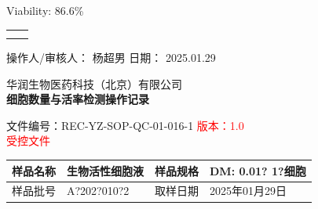 \documentclass[UTF8,10pt,a4paper,fontset=fandol]{ctexart}
\renewcommand{\arraystretch}{1.15}
\newcommand{\fieldvalue}[1]{#1}
\newcommand{\handwritten}[1]{#1}
\begin{document}
\begin{center}
\begin{center}
Viability:
\fieldvalue{86.6\%}

\vspace{1em}

\begin{center}
\begin{tabular}{cc}
\fbox{\rule{0pt}{0.27\textwidth}\rule{0.43\textwidth}{0pt}}
&
\fbox{\rule{0pt}{0.27\textwidth}\rule{0.43\textwidth}{0pt}}
\\[1em]
\fbox{\rule{0pt}{0.27\textwidth}\rule{0.43\textwidth}{0pt}}
&
\fbox{\rule{0pt}{0.27\textwidth}\rule{0.43\textwidth}{0pt}}
\end{tabular}
\end{center}

\vfill

操作人/审核人：
\fieldvalue{\handwritten{杨超男}}
\hfill
日期：
\fieldvalue{\handwritten{2025.01.29}}

\newpage

\begin{center}
\small
华润生物医药科技（北京）有限公司\\
\textbf{细胞数量与活率检测操作记录}\\
\end{center}

\noindent
文件编号：REC-YZ-SOP-QC-01-016-1 \hfill
\textcolor{red}{版本：1.0}\\
\textcolor{red}{受控文件}

\renewcommand{\arraystretch}{1.25}

\noindent
\begin{tabularx}{\textwidth}{|p{2.2cm}|X|p{2.2cm}|X|}
\hline
样品名称 &
\fieldvalue{\handwritten{生物活性细胞液}} &
样品规格 &
\fieldvalue{\handwritten{DM: 0.01? 1?细胞}}\\
\hline
样品批号 &
\fieldvalue{\handwritten{A?202?010?2}} &
取样日期 &
\fieldvalue{\handwritten{2025年01月29日}}\\
\hline
\end{tabularx}


\end{center}
\end{center}
\end{document}

